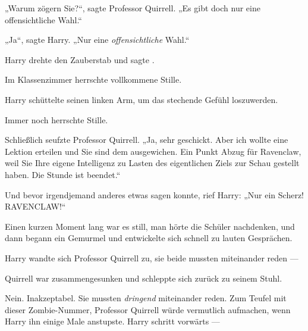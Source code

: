 „Warum zögern Sie?“, sagte Professor Quirrell.
„Es gibt doch nur eine offensichtliche Wahl.“

„Ja“, sagte Harry.
„Nur eine \emph{offensichtliche} Wahl.“

Harry drehte den Zauberstab und sagte .

Im Klassenzimmer herrschte vollkommene Stille.

Harry schüttelte seinen linken Arm, um das stechende Gefühl loszuwerden.

Immer noch herrschte Stille.

Schließlich seufzte Professor Quirrell.
„Ja, sehr geschickt. Aber ich wollte eine Lektion erteilen und Sie sind dem ausgewichen. Ein Punkt Abzug für Ravenclaw, weil Sie Ihre eigene Intelligenz zu Lasten des eigentlichen Ziels zur Schau gestellt haben. Die Stunde ist beendet.“


Und bevor irgendjemand anderes etwas sagen konnte, rief Harry:
„Nur ein Scherz! RAVENCLAW!“

Einen kurzen Moment lang war es still, man hörte die Schüler nachdenken, und dann begann ein Gemurmel und entwickelte sich schnell zu lauten Gesprächen.

Harry wandte sich Professor Quirrell zu, sie beide mussten miteinander reden —

Quirrell war zusammengesunken und schleppte sich zurück zu seinem Stuhl.

Nein. Inakzeptabel. Sie mussten \emph{dringend} miteinander reden. Zum Teufel mit dieser Zombie-Nummer, Professor Quirrell würde vermutlich aufmachen, wenn Harry ihn einige Male anstupste. Harry schritt vorwärts —

